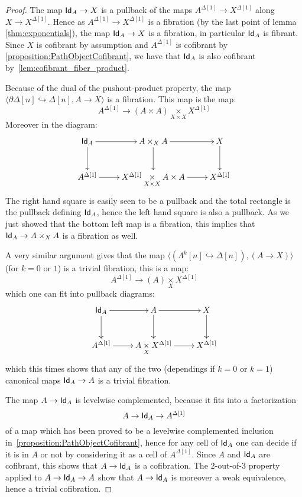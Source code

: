 \documentclass[reqno,10pt,a4paper,oneside,draft]{amsart}
\begin{document}
\begin{proof}

The map $\mathsf{Id}_A \rightarrow X$ is a pullback of the maps $A^{\Delta[1]} \rightarrow X^{\Delta[1]}$ along $X \rightarrow X^{\Delta[1]}$. Hence as $A^{\Delta[1]} \rightarrow X^{\Delta[1]}$ is a fibration (by the last point of lemma \ref{thm:exponentials}), the map $\mathsf{Id}_A \rightarrow X$ is a fibration, in particular $\mathsf{Id}_A$ is fibrant. Since $X$ is cofibrant by assumption and $A^{\Delta[1]}$ is  cofibrant by \cref{proposition:PathObjectCofibrant}, we have that $\mathsf{Id}_A$ is also cofibrant by~\cref{lem:cofibrant_fiber_product}. 

Because of the dual of the pushout-product property, the map $\langle \partial \Delta[n] \hookrightarrow \Delta[n] ,  A \rightarrow X \rangle$ is a fibration. This map is the map:
\[ 
A^{\Delta[1]} \rightarrow (A \times A) \underset{X \times X}{\times} X^{\Delta[1]} 
\] 
Moreover in the diagram:
\[
\xymatrix{
\Id_A \ar[r] \ar[d] & A \times_{X} A \ar[d] \ar[r] & X \ar[d] \\
A^{\Delta[1]} \ar[r] & X^{\Delta[1]} \underset{X \times X}{\times} A \times A \ar[r]  & X^{\Delta[1]}
}
 \]
The right hand square is easily seen to be a pullback and the total rectangle is the pullback defining $\mathsf{Id}_A$, hence the left hand square is also a pullback. As we just showed that the bottom left map is a fibration, this implies that $\mathsf{Id}_A \rightarrow A \times_{X} A$ is a fibration as well.

A very similar argument gives that the map $\langle (\Lambda^k[n] \hookrightarrow \Delta[n]) , ( A \rightarrow X) \rangle$ (for $k=0$ or $1$) is a trivial fibration, this is a map:
\[ 
A^{\Delta[1]} \rightarrow (A) \underset{X}{\times} X^{\Delta[1]} 
\] 
which one can fit into pullback diagrams:
\[
\xymatrix{
\Id_A \ar[r] \ar[d] & A  \ar[d] \ar[r] & X \ar[d] \\
A^{\Delta[1]} \ar[r] & A \underset{X}{\times} X^{\Delta[1]} \ar[r]  & X^{\Delta[1]}
}
 \]
which this times shows that any of the two (dependings if $k=0$ or $k=1$) canonical maps $\mathsf{Id}_A \rightarrow A$ is a trivial fibration.

The map $A \rightarrow \mathsf{Id}_A$ is levelwise complemented, because it fits into a factorization 
\[
A \rightarrow \mathsf{Id}_A \rightarrow A^{\Delta[1]}
\] 
of a map which has been proved to be a levelwise complemented inclusion in~\cref{proposition:PathObjectCofibrant}, hence for any cell of $\mathsf{Id}_A$ one can decide if it is in $A$ or not by considering it as a cell of $A^{\Delta[1]}$. Since $A$ and $\mathsf{Id}_A$ are cofibrant, this shows that $A \rightarrow \mathsf{Id}_A$ is a cofibration. The $2$-out-of-$3$ property applied to $A \rightarrow \mathsf{Id}_A \rightarrow A$ show that  $A \rightarrow \mathsf{Id}_A$ is moreover a weak equivalence, hence a trivial cofibration.
\end{proof}
\end{document}
